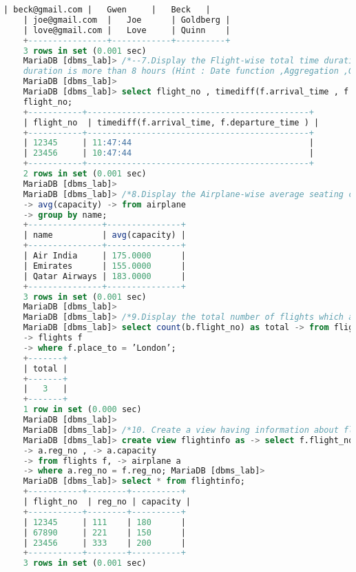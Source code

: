\documentclass{article}
\begin{document}
\begin{lstlisting}[language=SQL]
    | beck@gmail.com |   Gwen     |   Beck   |
    | joe@gmail.com  |   Joe      | Goldberg | 
    | love@gmail.com |   Love     | Quinn    |
    +----------------+------------+----------+ 
    3 rows in set (0.001 sec)
    MariaDB [dbms_lab]> /*--7.Display the Flight-wise total time duration of flights if the
    duration is more than 8 hours (Hint : Date function ,Aggregation ,Grouping)*/
    MariaDB [dbms_lab]>
    MariaDB [dbms_lab]> select flight_no , timediff(f.arrival_time , f.departure_time ) from flights as f where timediff(f.arrival_time, f.departure_time ) > "8:00:00" group by
    flight_no; 
    +-----------+---------------------------------------------+
    | flight_no  | timediff(f.arrival_time, f.departure_time ) | 
    +-----------+---------------------------------------------+
    | 12345     | 11:47:44                                    |
    | 23456     | 10:47:44                                    |
    +-----------+---------------------------------------------+ 
    2 rows in set (0.001 sec)
    MariaDB [dbms_lab]>
    MariaDB [dbms_lab]> /*8.Display the Airplane-wise average seating capacity for any airline*/ MariaDB [dbms_lab]> select name,
    -> avg(capacity) -> from airplane
    -> group by name; 
    +---------------+---------------+
    | name          | avg(capacity) | 
    +---------------+---------------+
    | Air India     | 175.0000      | 
    | Emirates      | 155.0000      |
    | Qatar Airways | 183.0000      |
    +---------------+---------------+ 
    3 rows in set (0.001 sec)
    MariaDB [dbms_lab]>
    MariaDB [dbms_lab]> /*9.Display the total number of flights which are booked and travelling to London airport.*/
    MariaDB [dbms_lab]> select count(b.flight_no) as total -> from flight_booking b,
    -> flights f
    -> where f.place_to = ’London’;
    +-------+ 
    | total |
    +-------+ 
    |   3   |
    +-------+
    1 row in set (0.000 sec)
    MariaDB [dbms_lab]>
    MariaDB [dbms_lab]> /*10. Create a view having information about flight_no ,airplane_no , capacity.*/
    MariaDB [dbms_lab]> create view flightinfo as -> select f.flight_no ,
    -> a.reg_no , -> a.capacity
    -> from flights f, -> airplane a
    -> where a.reg_no = f.reg_no; MariaDB [dbms_lab]>
    MariaDB [dbms_lab]> select * from flightinfo; 
    +-----------+--------+----------+
    | flight_no  | reg_no | capacity | 
    +-----------+--------+----------+
    | 12345     | 111    | 180      |
    | 67890     | 221    | 150      |
    | 23456     | 333    | 200      |
    +-----------+--------+----------+ 
    3 rows in set (0.001 sec)
\end{lstlisting}
\end{document}
